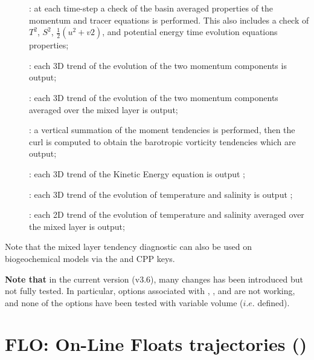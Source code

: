 \documentclass[../tex_main/NEMO_manual]{subfiles}
\begin{document}
\begin{description}
	\item[]: at each  time-step a check of the basin averaged properties of 
										the momentum and tracer equations is performed.
										This also includes a check of $T^2$, $S^2$, $\tfrac{1}{2} (u^2+v2)$, and 
										potential energy time evolution equations properties;
	\item[]: each 3D trend of the evolution of the two momentum components is output;
	\item[]: each 3D trend of the evolution of the two momentum components averaged over 
										the mixed layer is output;
	\item[]: a vertical summation of the moment tendencies is performed, then 
										the curl is computed to obtain the barotropic vorticity tendencies which 
										are output;
	\item[] : each 3D trend of the Kinetic Energy equation is output ;
	\item[]: each 3D trend of the evolution of temperature and salinity is output ;
	\item[]: each 2D trend of the evolution of temperature and salinity averaged over 
										the mixed layer is output;
\end{description}

Note that the mixed layer tendency diagnostic can also be used on biogeochemical models via 
the  and  CPP keys.

\textbf{Note that} in the current version (v3.6), many changes has been introduced but not fully tested.
In particular, options associated with , , and  are 
not working, and none of the options have been tested with variable volume ($i.e.$  defined).

\section{FLO: On-Line Floats trajectories (\protect{})}
\label{sec:FLO}
\end{document}
